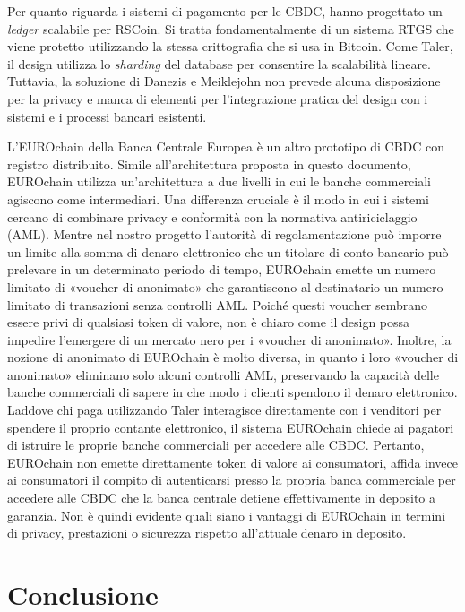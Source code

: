 \documentclass[a4paper]{article}
\begin{document}
Per quanto riguarda i sistemi di pagamento per le CBDC, \cite{Danezis}
hanno progettato un \textit{ledger} scalabile per RSCoin. Si tratta
fondamentalmente di un sistema RTGS che viene protetto utilizzando la
stessa crittografia che si usa in Bitcoin. Come Taler, il design utilizza
lo \textit{sharding} del database per consentire la scalabilità lineare.
Tuttavia, la soluzione di Danezis e Meiklejohn non prevede alcuna
disposizione per la privacy e manca di elementi per l'integrazione
pratica del design con i sistemi e i processi bancari esistenti.

L'EUROchain della Banca Centrale Europea\cite[vedi][]{ECB} è un altro
prototipo di CBDC con registro distribuito. Simile all'architettura
proposta in questo documento, EUROchain utilizza un'architettura a due
livelli in cui le banche commerciali agiscono come intermediari. Una
differenza cruciale è il modo in cui i sistemi cercano di combinare
privacy e conformità con la normativa antiriciclaggio (AML). Mentre nel
nostro progetto l'autorità di regolamentazione può imporre un limite
alla somma di denaro elettronico che un titolare di conto bancario può
prelevare in un determinato periodo di tempo, EUROchain emette un numero
limitato di «voucher di anonimato» che garantiscono al destinatario un
numero limitato di transazioni senza controlli AML. Poiché questi voucher
sembrano essere privi di qualsiasi token di valore, non è chiaro come
il design possa impedire l'emergere di un mercato nero per i «voucher
di anonimato». Inoltre, la nozione di anonimato di EUROchain è molto
diversa, in quanto i loro «voucher di anonimato» eliminano solo alcuni
controlli AML, preservando la capacità delle banche commerciali di
sapere in che modo i clienti spendono il denaro elettronico. Laddove chi
paga utilizzando Taler interagisce direttamente con i venditori per
spendere il proprio contante elettronico, il sistema EUROchain chiede
ai pagatori di istruire le proprie banche commerciali per accedere alle
CBDC. Pertanto, EUROchain non emette direttamente token di valore ai
consumatori, affida invece ai consumatori il compito di autenticarsi
presso la propria banca commerciale per accedere alle CBDC che la
banca centrale detiene effettivamente in deposito a garanzia. Non è
quindi evidente quali siano i vantaggi di EUROchain in termini di
privacy, prestazioni o sicurezza rispetto all'attuale denaro in deposito.

\section{Conclusione}\label{7.-conclusione}
\end{document}
